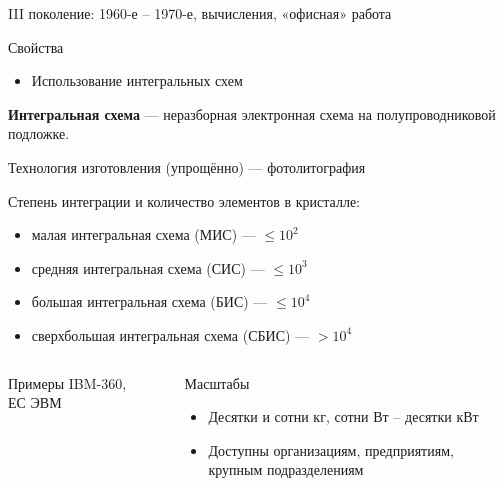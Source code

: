 \documentclass[xetex,aspectratio=43]{beamer}
\begin{document}
\begin{frame}{III поколение: 1960-е -- 1970-е, вычисления, «офисная» работа}
	
	
	\begin{block}{Свойства}
		\begin{itemize}
			\item
			Использование интегральных схем
		\end{itemize}
		
		\textbf{Интегральная схема} --- неразборная электронная схема на
		полупроводниковой подложке.
		
		Технология изготовления (упрощённо) --- фотолитография
		
		Степень интеграции и количество элементов в кристалле:
		
		\begin{itemize}
			\tightlist
			\item
			малая интегральная схема (МИС) --- \(\le 10^2\)
			\item
			средняя интегральная схема (СИС) --- \(\le 10^3\)
			\item
			большая интегральная схема (БИС) --- \(\le 10^4\)
			\item
			сверхбольшая интегральная схема (СБИС) --- \(> 10^4\)
		\end{itemize}
	\end{block}
	
	\begin{columns}
		\begin{column}{0.2\textwidth}
			\begin{block}{Примеры}
				\vspace{5mm}
				IBM-360, ЕС ЭВМ
				\vspace{6mm}
			\end{block}
		\end{column}
		\begin{column}{0.02\textwidth}\end{column}
		\begin{column}{0.75\textwidth}	
			\begin{block}{Масштабы}
				\begin{itemize}
					\item
					Десятки и сотни кг, сотни Вт -- десятки кВт
					\item
					Доступны организациям, предприятиям, крупным подразделениям
				\end{itemize}
			\end{block}
		\end{column}
	\end{columns}

\end{frame}
\end{document}
